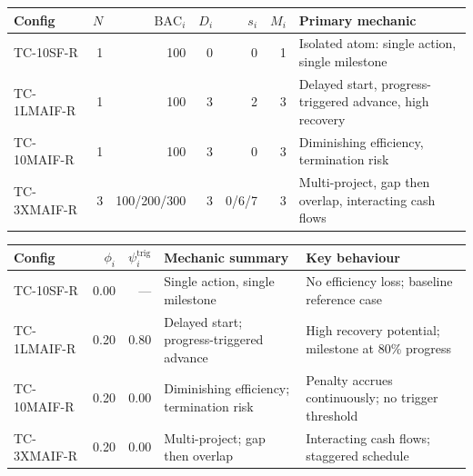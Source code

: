 \documentclass[varwidth=180mm, border=4pt]{standalone}
\newcommand{\tabfont}{\fontsize{8.5}{10.5}\selectfont}
\begin{document}
\tabfont
\setlength{\tabcolsep}{5pt}
\renewcommand{\arraystretch}{1.15}


\noindent
\begin{tabularx}{170mm}{lNNNNNL}
\toprule
\textbf{Config} &
  $N$ &
  $\mathrm{BAC}_i$ &
  $D_i$ &
  $s_i$ &
  $M_i$ &
  \textbf{Primary mechanic} \\
\midrule
TC-10SF-R   & 1 & 100         & 0 & 0     & 1 &
  Isolated atom: single action, single milestone \\
TC-1LMAIF-R & 1 & 100         & 3 & 2     & 3 &
  Delayed start, progress-triggered advance, high recovery \\
TC-10MAIF-R & 1 & 100         & 3 & 0     & 3 &
  Diminishing efficiency, termination risk \\
TC-3XMAIF-R & 3 & 100/200/300 & 3 & 0/6/7 & 3 &
  Multi-project, gap then overlap, interacting cash flows \\
\bottomrule
\end{tabularx}

\bigskip


\noindent
\begin{tabularx}{170mm}{lNNLL}
\toprule
\textbf{Config} &
  $\phi_i$ &
  $\psi^{\mathrm{trig}}_i$ &
  \textbf{Mechanic summary} &
  \textbf{Key behaviour} \\
\midrule
TC-10SF-R   & 0.00 & ---  &
  Single action, single milestone &
  No efficiency loss; baseline reference case \\
TC-1LMAIF-R & 0.20 & 0.80 &
  Delayed start; progress-triggered advance &
  High recovery potential; milestone at 80\% progress \\
TC-10MAIF-R & 0.20 & 0.00 &
  Diminishing efficiency; termination risk &
  Penalty accrues continuously; no trigger threshold \\
TC-3XMAIF-R & 0.20 & 0.00 &
  Multi-project; gap then overlap &
  Interacting cash flows; staggered schedule \\
\bottomrule
\end{tabularx}
\end{document}
